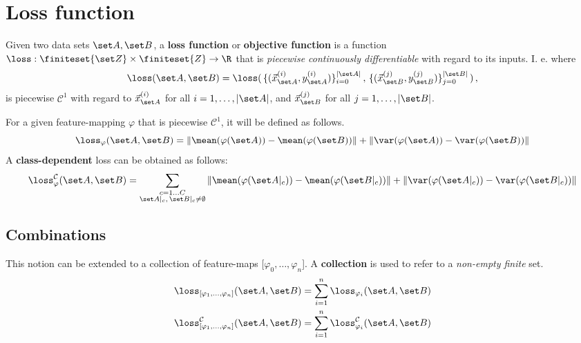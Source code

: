 \section{Loss function}
Given two data sets $\set A, \set B$, a \textbf{loss function} or \textbf{objective function} is a function $\loss : \finiteset{\set Z} \times \finiteset{Z} \to \R$ that is \textit{piecewise continuously differentiable} with regard to its inputs.
I. e. where 
\[
    \loss (\set A, \set B) = \loss (
    \,\{(\vec x^{(i)}_{\set A}, y^{(i)}_{\set A})\}_{i=0}^{|\set A|}\,,
    \,\{(\vec x^{(j)}_{\set B}, y^{(j)}_{\set B})\}_{j=0}^{|\set B|}\,) \,,
\]
is piecewise $\mathcal C^1$ with regard to $\vec x^{(i)}_{\set A}$
for all $i=1, \dots, |\set A|$, and $\vec x^{(j)}_{\set B}$ for all $j=1, \dots, |\set B|$.


For a given feature-mapping $\varphi$ that is piecewise $\mathcal C ^1$, it will be defined as follows.
% 
\[
    \loss _{\varphi} (\set A, \set B) = 
    \|\mean ({\varphi (\set A)}) - \mean ({\varphi (\set B)})\| +
    \|\var ({\varphi (\set A)}) - \var ({\varphi (\set B)})\|
\]
% 
A \textbf{class-dependent} loss can be obtained as follows:
\[
    \loss _\varphi ^{\mathcal C} (\set A, \set B) =
    \sum _{\substack{c = 1 \dots C \\ \set A|_c ,\, \set B|_c \neq \emptyset}} 
    \|\mean ({\varphi (\set A|_c)}) - \mean({\varphi (\set B|_c)})\|
    + \|\var ({\varphi (\set A|_c)}) - \var ({\varphi (\set B|_c)})\| 
\]

\subsection{Combinations}
% 
This notion can be extended to a collection of feature-maps [$\varphi_0, \dots, \varphi_n$].
A \textbf{collection} is used to refer to a \textit{non-empty finite} set.
\begin{align*}
    \loss_{[\varphi_1, \dots, \varphi_n]} (\set A, \set B) &= 
    \sum_{i=1}^n \loss_{\varphi_i} (\set A, \set B) \\
    \loss_{[\varphi_1, \dots, \varphi_n]}^{\mathcal C} (\set A, \set B) &= 
    \sum_{i=1}^n \loss_{\varphi_i}^{\mathcal C} (\set A, \set B)
\end{align*}
